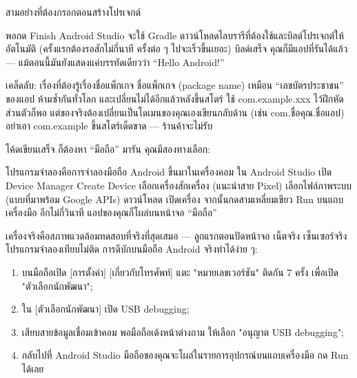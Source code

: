 \begin{center}\small\color{gray}สามอย่างที่ต้องกรอกตอนสร้างโปรเจกต์\end{center}

พอกด Finish Android Studio จะใช้ Gradle ดาวน์โหลดไลบรารีที่ต้องใช้และบิลด์โปรเจกต์ให้อัตโนมัติ (ครั้งแรกต้องรอสักไม่กี่นาที ครั้งต่อ ๆ ไปจะเร็วขึ้นเยอะ) บิลด์เสร็จ คุณก็มีแอปที่รันได้แล้ว — แม้ตอนนี้มันยังแสดงแค่บรรทัดเดียวว่า “Hello Android!”

\begin{tcbinfo}{เคล็ดลับ: เรื่องที่ต้องรู้เรื่องชื่อแพ็กเกจ}
ชื่อแพ็กเกจ (package name) เหมือน “เลขบัตรประชาชน” ของแอป ห้ามซ้ำกันทั่วโลก และเปลี่ยนไม่ได้อีกแล้วหลังขึ้นสโตร์ ใช้ com.example.xxx ไว้ฝึกหัดส่วนตัวก็พอ แต่ของจริงต้องเปลี่ยนเป็นโดเมนของคุณเองเขียนกลับด้าน (เช่น com.ชื่อคุณ.ชื่อแอป) อย่าเอา com.example ขึ้นสโตร์เด็ดขาด — ร้านค้าจะไม่รับ

\end{tcbinfo}


โค้ดเขียนเสร็จ ก็ต้องหา “มือถือ” มารัน คุณมีสองทางเลือก:


โปรแกรมจำลองคือการจำลองมือถือ Android ขึ้นมาในเครื่องคอม ใน Android Studio เปิด Device Manager Create Device เลือกเครื่องสักเครื่อง (แนะนำสาย Pixel) เลือกไฟล์ภาพระบบ (แบบที่มาพร้อม Google APIs) ดาวน์โหลด เปิดเครื่อง จากนั้นกดสามเหลี่ยมเขียว Run บนแถบเครื่องมือ อีกไม่กี่วินาที แอปของคุณก็โผล่บนหน้าจอ “มือถือ”


เครื่องจริงคือสภาพแวดล้อมทดสอบที่จริงที่สุดเสมอ — ลูกแรกตอนปัดหน้าจอ เน็ตจริง เซ็นเซอร์จริง โปรแกรมจำลองเทียบไม่ติด การดีบักบนมือถือ Android จริงทำได้ง่าย ๆ:

\begin{enumerate}
  \item บนมือถือเปิด [การตั้งค่า] [เกี่ยวกับโทรศัพท์] แตะ "หมายเลขเวอร์ชัน" ติดกัน 7 ครั้ง เพื่อเปิด "ตัวเลือกนักพัฒนา";
  \item ใน [ตัวเลือกนักพัฒนา] เปิด USB debugging;
  \item เสียบสายข้อมูลเชื่อมเข้าคอม พอมือถือเด้งหน้าต่างถาม ให้เลือก "อนุญาต USB debugging";
  \item กลับไปที่ Android Studio มือถือของคุณจะโผล่ในรายการอุปกรณ์บนแถบเครื่องมือ กด Run ได้เลย
\end{enumerate}

